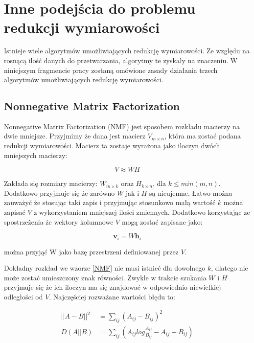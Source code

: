 \documentclass[oneside, eng]{mgr}
\newcommand{\bb}{\textbf}
\begin{document}
\section{Inne podejścia do problemu redukcji wymiarowości}
Istnieje wiele algorytmów umożliwiających redukcję wymiarowości. Ze względu na rosnącą ilość danych do przetwarzania, algorytmy te zyskały na znaczeniu. W niniejszym fragmencie pracy zostaną omówione zasady działania trzech algorytmów umożliwiających redukcję wymiarowości.

\subsection{Nonnegative Matrix Factorization}

Nonnegative Matrix Factorization (NMF) jest sposobem rozkładu macierzy na dwie mniejsze. Przyjmimy że dana jest macierz $V_{m \times n}$, która ma zostać podana redukcji wymiarowości. Macierz ta zostaje wyrażona jako iloczyn dwóch mniejszych macierzy:

\begin{equation}
	V \approx WH
\label{NMF}
\end{equation}

Zakłada się rozmiary macierzy: $W_{m \times k}$ oraz $H_{k \times n}$, dla $k \leq min(m,n)$. Dodatkowo przyjmuje się że zarówno $W$ jak i $H$ są nieujemne. Łatwo można zauważyć że stosując taki zapis i przyjmując stosunkowo małą wartość $k$ można zapisać $V$ z wykorzystaniem mniejszej ilości zmiennych. Dodatkowo korzystając ze spostrzeżenia że wektory kolumnowe $V$ mogą zostać zapisane jako:

\begin{equation}
	\bb{v}_i = W \bb{h}_i
\end{equation}

można przyjąć W jako bazę przestrzeni definiowanej przez $V$.

Dokładny rozkład we wzorze \ref{NMF} nie musi istnieć dla dowolnego $k$, dlatego nie może zostać umieszczony znak równości. Zwykle w trakcie szukania $W$ i $H$ przyjmuje się że ich iloczyn ma się znajdować w odpowiednio niewielkiej odległości od $V$. Najczęściej rozważane wartości błędu to:

\begin{align*}
	||A - B||^2 &= \sum_{ij} (A_{ij} - B_{ij})^2 \\
	  D(A||B)   &= \sum_{ij} (A_{ij} log \frac{A_{ij}}{B_{ij}} - A_{ij} + B_{ij})
\end{align*}
\end{document}
